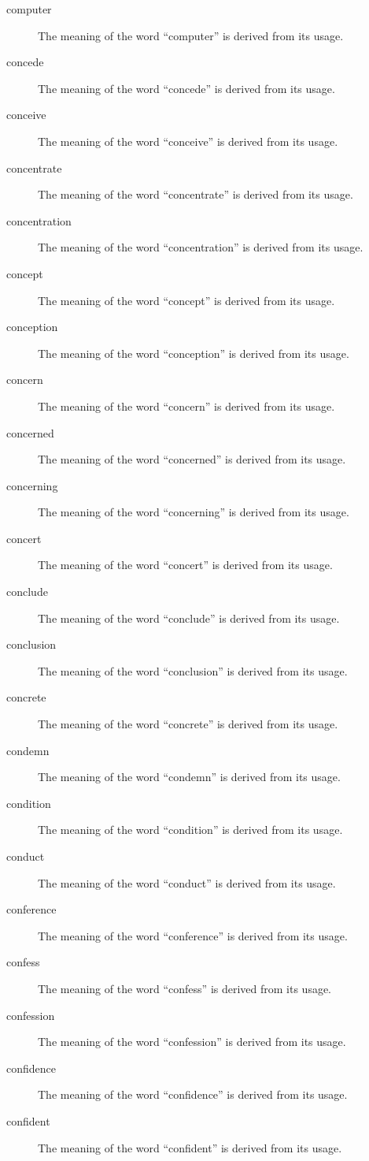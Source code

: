 \documentclass[12pt, letterpaper]{memoir}
\begin{document}
\begin{description}
\item[computer] The meaning of the word ``computer'' is derived from its usage.
\item[concede] The meaning of the word ``concede'' is derived from its usage.
\item[conceive] The meaning of the word ``conceive'' is derived from its usage.
\item[concentrate] The meaning of the word ``concentrate'' is derived from its usage.
\item[concentration] The meaning of the word ``concentration'' is derived from its usage.
\item[concept] The meaning of the word ``concept'' is derived from its usage.
\item[conception] The meaning of the word ``conception'' is derived from its usage.
\item[concern] The meaning of the word ``concern'' is derived from its usage.
\item[concerned] The meaning of the word ``concerned'' is derived from its usage.
\item[concerning] The meaning of the word ``concerning'' is derived from its usage.
\item[concert] The meaning of the word ``concert'' is derived from its usage.
\item[conclude] The meaning of the word ``conclude'' is derived from its usage.
\item[conclusion] The meaning of the word ``conclusion'' is derived from its usage.
\item[concrete] The meaning of the word ``concrete'' is derived from its usage.
\item[condemn] The meaning of the word ``condemn'' is derived from its usage.
\item[condition] The meaning of the word ``condition'' is derived from its usage.
\item[conduct] The meaning of the word ``conduct'' is derived from its usage.
\item[conference] The meaning of the word ``conference'' is derived from its usage.
\item[confess] The meaning of the word ``confess'' is derived from its usage.
\item[confession] The meaning of the word ``confession'' is derived from its usage.
\item[confidence] The meaning of the word ``confidence'' is derived from its usage.
\item[confident] The meaning of the word ``confident'' is derived from its usage.

\end{description}
\end{document}
